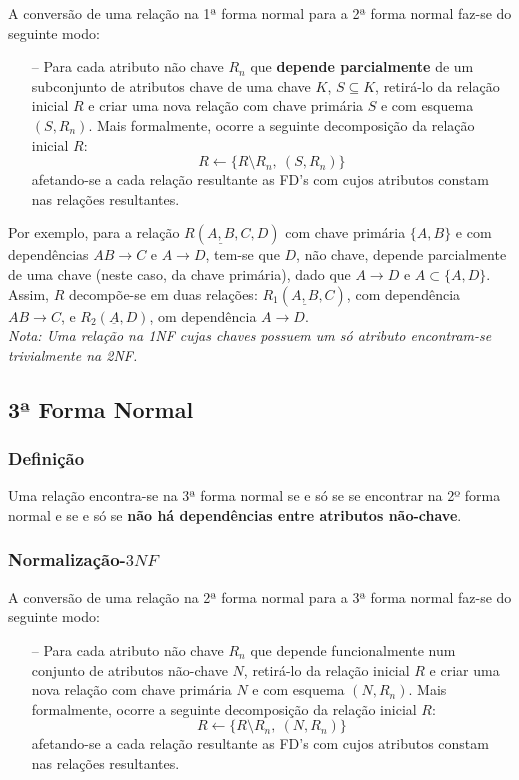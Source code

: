 \documentclass[oneside]{book}
\theoremstyle{definition}
\begin{document}
A conversão de uma relação na 1ª forma normal para a 2ª forma normal faz-se do seguinte modo:

\begin{itemize}
    \itemsep0cm
    \item[--] Para cada atributo não chave $R_n$ que \textbf{depende parcialmente} de um subconjunto de atributos chave de uma chave $K$, $S \subseteq K$, retirá-lo da relação inicial $R$ e criar uma nova relação com chave primária $S$ e com esquema $(S, R_n)$. Mais formalmente, ocorre a seguinte decomposição da relação inicial $R$: 
    \[
        R \gets \{R \setminus R_n,\:  (S, R_n)\}
    \]
    afetando-se a cada relação resultante as FD's com cujos atributos constam nas relações resultantes.
\end{itemize}

Por exemplo, para a relação $R(\underline{A, B}, C, D)$ com chave primária $\{A, B\}$ e com dependências $AB \rightarrow C$ e $A \rightarrow D$, tem-se que $D$, não chave, depende parcialmente de uma chave (neste caso, da chave primária), dado que $A \rightarrow D$ e $A \subset \{A, D\}$. Assim, $R$ decompõe-se em duas relações: $R_1(\underline{A, B}, C)$, com dependência $AB \rightarrow C$, e $R_2(\underline{A}, D)$, om dependência $A \rightarrow D$.\\ 
\vspace*{0.3em}
\textit{Nota: Uma relação na 1NF cujas chaves possuem um só atributo encontram-se trivialmente na 2NF.}

\subsection{3ª Forma Normal}

\subsubsection*{Definição}

Uma relação encontra-se na 3ª forma normal se e só se se encontrar na 2º forma normal e se e só se \textbf{não há dependências entre atributos não-chave}.

\subsubsection*{Normalização-$3NF$}

A conversão de uma relação na 2ª forma normal para a 3ª forma normal faz-se do seguinte modo:

\begin{itemize}
    \itemsep0cm
    \item[--] Para cada atributo não chave $R_n$ que depende funcionalmente num conjunto de atributos não-chave $N$, retirá-lo da relação inicial $R$ e criar uma nova relação com chave primária $N$ e com esquema $(N, R_n)$. Mais formalmente, ocorre a seguinte decomposição da relação inicial $R$: 
    \[
        R \gets \{R \setminus R_n,\:  (N, R_n)\}
    \]
    afetando-se a cada relação resultante as FD's com cujos atributos constam nas relações resultantes.
\end{itemize}
\end{document}
